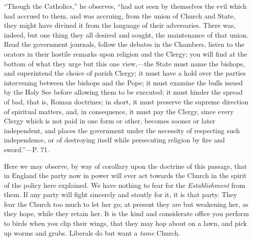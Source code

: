 ``Though
the Catholics,'' he observes, ``had not seen by themselves the evil
which had accrued to them, and was accruing, from the union of Church
and State, they might have divined it from the language of their
adversaries. There was, indeed, but one thing they all desired and
sought, the maintenance of that union. Read the government journals,
follow the debates in the Chambers, listen to the orators in their
hostile remarks upon religion and the Clergy; you will find at the
bottom of what they urge but this one view,—the State must name the
bishops, and superintend the choice of parish Clergy; it must have a
hold over the parties intervening between the bishops and the Pope; it
must examine the bulls issued by the Holy See before allowing them to
be executed; it must hinder the spread of bad, that is, Roman
doctrines; in short, it must
preserve the supreme direction of spiritual matters, and, in
consequence, it must pay the Clergy, since every Clergy which is not
paid in one form or other, becomes sooner or later independent, and
places the government under the necessity of respecting such
independence, or of destroying itself while persecuting religion by
fire and sword.''—P. 71.

Here we may observe, by way of corollary upon the
doctrine of this passage, that in England the party now in power will
ever act towards the Church in the spirit of the policy here
explained. We have nothing to fear for the \emph{Establishment} from
them. If any party will fight sincerely and stoutly for it, it is that
party. They fear the Church too much to let her go; at present they
are but weakening her, as they hope, while they retain her. It is the
kind and considerate office you perform to birds when you clip their
wings, that they may hop about on a lawn, and pick up worms and grubs.
Liberals do but want a \emph{tame} Church.

